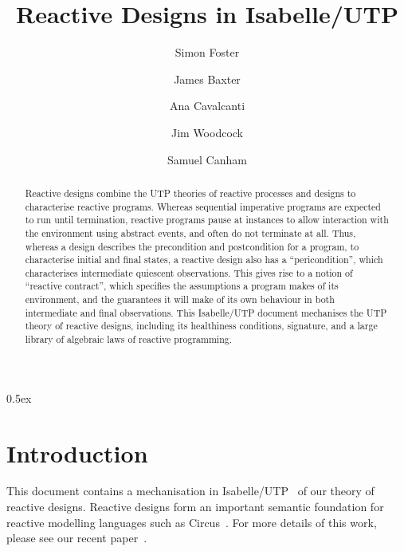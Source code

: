 \documentclass[11pt,a4paper]{article}
\begin{document}
\title{Reactive Designs in Isabelle/UTP}

\author{Simon Foster \and James Baxter \and Ana Cavalcanti \and Jim Woodcock \and Samuel Canham}

\maketitle

\begin{abstract}
  Reactive designs combine the UTP theories of reactive processes and designs to characterise
  reactive programs. Whereas sequential imperative programs are expected to run until termination,
  reactive programs pause at instances to allow interaction with the environment using abstract
  events, and often do not terminate at all. Thus, whereas a design describes the precondition and 
  postcondition for a program, to characterise initial and final states, a reactive design also has 
  a ``pericondition'', which characterises intermediate quiescent observations. This gives rise
  to a notion of ``reactive contract'', which specifies the assumptions a program makes of its
  environment, and the guarantees it will make of its own behaviour in both intermediate and final
  observations. This Isabelle/UTP document mechanises the UTP theory of reactive designs, including
  its healthiness conditions, signature, and a large library of algebraic laws of reactive programming.
\end{abstract}

\tableofcontents

\parindent 0pt\parskip 0.5ex

\section{Introduction}

This document contains a mechanisation in Isabelle/UTP~\cite{Foster16a} of our theory of reactive designs. Reactive
designs form an important semantic foundation for reactive modelling languages such as Circus~\cite{Oliveira2005-PHD}.
For more details of this work, please see our recent paper~\cite{Foster17c}.





\end{document}
